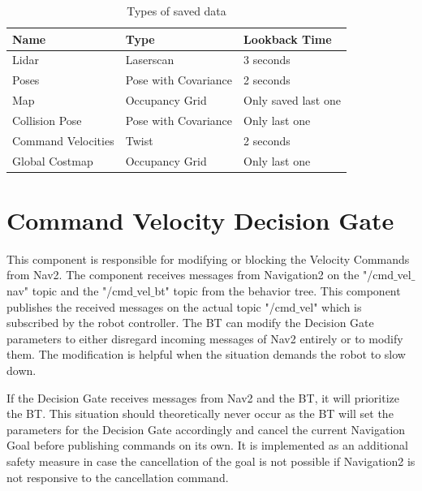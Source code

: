 \begin{table}[ht]
	\centering
	\caption{Types of saved data}
	\label{tab:data_backup_types}
	\renewcommand{\arraystretch}{1.5}
		\begin{tabular}{ | l | l | l | }
	 	\hline
	 	\textbf{Name} & \textbf{Type} & \textbf{Lookback Time} \\ 
	 	\hline
	 	Lidar & Laserscan & 3 seconds \\
	 	\hline
	 	Poses & Pose with Covariance & 2 seconds\\ 
	 	\hline
	 	Map & Occupancy Grid & Only saved last one \\ 
	 	\hline
	 	Collision Pose & Pose with Covariance & Only last one \\
	 	\hline
	 	Command Velocities & Twist & 2 seconds\\
	 	\hline 	
	 	Global Costmap & Occupancy Grid & Only last one \\
	 	\hline
		\end{tabular}
\end{table}



\section{Command Velocity Decision Gate}

This component is responsible for modifying or blocking the Velocity Commands from Nav2. The component receives messages from Navigation2 on the "/cmd$\_$vel$\_$nav" topic and the "/cmd$\_$vel$\_$bt" topic from the behavior tree. This component publishes the received messages on the actual topic "/cmd$\_$vel" which is subscribed by the robot controller.  The BT can modify the Decision Gate parameters to either disregard incoming messages of Nav2 entirely or to modify them. The modification is helpful when the situation demands the robot to slow down. 

If the Decision Gate receives messages from Nav2 and the BT, it will prioritize the BT. This situation should theoretically never occur as the BT will set the parameters for the Decision Gate accordingly and cancel the current Navigation Goal before publishing commands on its own. It is implemented as an additional safety measure in case the cancellation of the goal is not possible if Navigation2 is not responsive to the cancellation command. 

